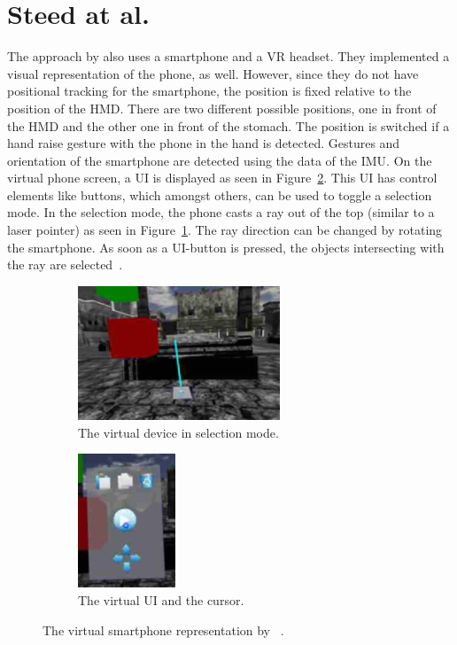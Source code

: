 \section{Steed at al.}\label{section:steed-2013}
The approach by \citeauthor{Steed.2013} also uses a smartphone and a \ac{VR} headset. They implemented a visual representation of the phone, as well. However, since they do not have positional tracking for the smartphone, the position is fixed relative to the position of the \ac{HMD}. There are two different possible positions, one in front of the \ac{HMD} and the other one in front of the stomach. The position is switched if a hand raise gesture with the phone in the hand is detected. Gestures and orientation of the smartphone are detected using the data of the \ac{IMU}. On the virtual phone screen, a \ac{UI} is displayed as seen in Figure~\ref{fig:steed-2013-ui}. This \ac{UI} has control elements like buttons, which amongst others, can be used to toggle a selection mode. In the selection mode, the phone casts a ray out of the top (similar to a laser pointer) as seen in Figure~\ref{fig:steed-2013-laser-pointer}. The ray direction can be changed by rotating the smartphone. As soon as a \ac{UI}-button is pressed, the objects intersecting with the ray are selected~\cite{Steed.2013}.

\begin{figure}[H]
  \centering
  \begin{subfigure}{0.45\textwidth}%
    \centering%
    \includegraphics[height=4cm]{figures/related_work/steed_2013_laser_pointer.png}
    \caption{The virtual device in selection mode.}\label{fig:steed-2013-laser-pointer}%
  \end{subfigure}%
  \hspace{0.1\textwidth}%
  \begin{subfigure}{0.45\textwidth}%
    \centering%
    \includegraphics[height=4cm]{figures/related_work/steed_2013_ui.png}
    \caption{The virtual \ac{UI} and the cursor.}\label{fig:steed-2013-ui}
  \end{subfigure}%
  \caption[Virtual smartphone representation by Steep et al.]{The virtual smartphone representation by \citeauthor{Steed.2013}~\protect\cite[43]{Steed.2013}.}\label{fig:steed-2013}
\end{figure}